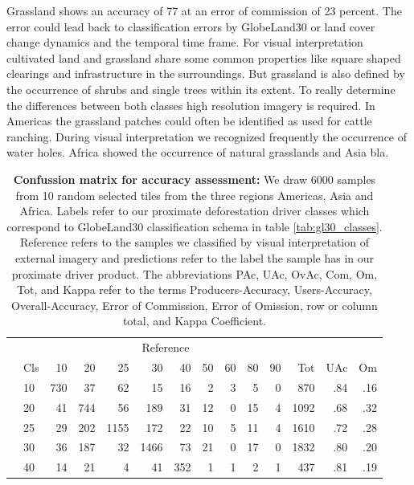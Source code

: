 			Grassland shows an accuracy of 77 at an error of commission of 23 percent. The error could lead back to classification errors by GlobeLand30 or land cover change dynamics and the temporal time frame. For visual interpretation cultivated land and grassland share some common properties like square shaped clearings and infrastructure in the surroundings. But grassland is also defined by the occurrence of shrubs and single trees within its extent. To really determine the differences between both classes high resolution imagery is required. In Americas the grassland patches could often be identified as used for cattle ranching. During visual interpretation we recognized frequently the occurrence of water holes. Africa showed the occurrence of natural grasslands and Asia bla.

			\begin{table}[ht]
				\centering
				\caption[Confussion matrix]{\textbf{Confussion matrix for accuracy assessment:} We draw 6000 samples from 10 random selected tiles from the three regions Americas, Asia and Africa. Labels refer to our proximate deforestation driver classes which correspond to GlobeLand30 classification schema in table \ref{tab:gl30_classes}. Reference refers to the samples we classified by visual interpretation of external imagery and predictions refer to the label the sample has in our proximate driver product. The abbreviations PAc, UAc, OvAc, Com, Om, Tot, and Kappa refer to the terms Producers-Accuracy, Users-Accuracy, Overall-Accuracy, Error of Commission, Error of Omission, row or column total, and Kappa Coefficient.}
				\label{tab:results_confusion_matrix}
				\begin{tabular}{llrrrrrrrrrrrr}
					\hline
					& & \multicolumn{9}{c}{Reference} & & & \\\cline{3-11}
					& Cls & 10 & 20 & 25 & 30 & 40 & 50 & 60 & 80 & 90 & Tot & UAc & Om \\\hline
					\multirow{9}{*}{\STAB{\rotatebox[origin=c]{90}{Prediction}}}
					& 10 & 730 & 37 & 62 & 15 & 16 & 2 & 3 & 5 & 0 & 870 & .84 & .16 \\ 
					& 20 & 41 & 744 & 56 & 189 & 31 & 12 & 0 & 15 & 4 & 1092 & .68 & .32 \\ 
					& 25 & 29 & 202 & 1155 & 172 & 22 & 10 & 5 & 11 & 4 & 1610 & .72 & .28 \\ 
					& 30 & 36 & 187 & 32 & 1466 & 73 & 21 & 0 & 17 & 0 & 1832 & .80 & .20 \\ 
					& 40 & 14 & 21 & 4 & 41 & 352 & 1 & 1 & 2 & 1 & 437 & .81 & .19 \\ 

\end{tabular}
\end{table}

